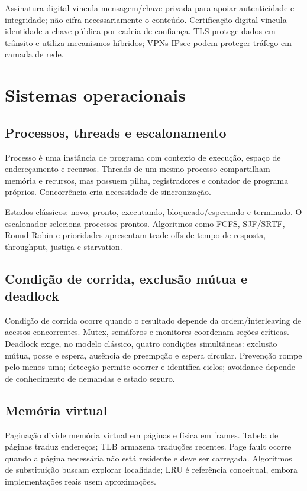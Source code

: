 Assinatura digital vincula mensagem/chave privada para apoiar autenticidade e integridade; não cifra necessariamente o conteúdo. Certificação digital vincula identidade a chave pública por cadeia de confiança. TLS protege dados em trânsito e utiliza mecanismos híbridos; VPNs IPsec podem proteger tráfego em camada de rede.

\section{Sistemas operacionais}

\subsection{Processos, threads e escalonamento}

Processo é uma instância de programa com contexto de execução, espaço de endereçamento e recursos. Threads de um mesmo processo compartilham memória e recursos, mas possuem pilha, registradores e contador de programa próprios. Concorrência cria necessidade de sincronização.

Estados clássicos: novo, pronto, executando, bloqueado/esperando e terminado. O escalonador seleciona processos prontos. Algoritmos como FCFS, SJF/SRTF, Round Robin e prioridades apresentam trade-offs de tempo de resposta, throughput, justiça e starvation.

\subsection{Condição de corrida, exclusão mútua e deadlock}

Condição de corrida ocorre quando o resultado depende da ordem/interleaving de acessos concorrentes. Mutex, semáforos e monitores coordenam seções críticas. Deadlock exige, no modelo clássico, quatro condições simultâneas: exclusão mútua, posse e espera, ausência de preempção e espera circular. Prevenção rompe pelo menos uma; detecção permite ocorrer e identifica ciclos; avoidance depende de conhecimento de demandas e estado seguro.

\subsection{Memória virtual}

Paginação divide memória virtual em páginas e física em frames. Tabela de páginas traduz endereços; TLB armazena traduções recentes. Page fault ocorre quando a página necessária não está residente e deve ser carregada. Algoritmos de substituição buscam explorar localidade; LRU é referência conceitual, embora implementações reais usem aproximações.

